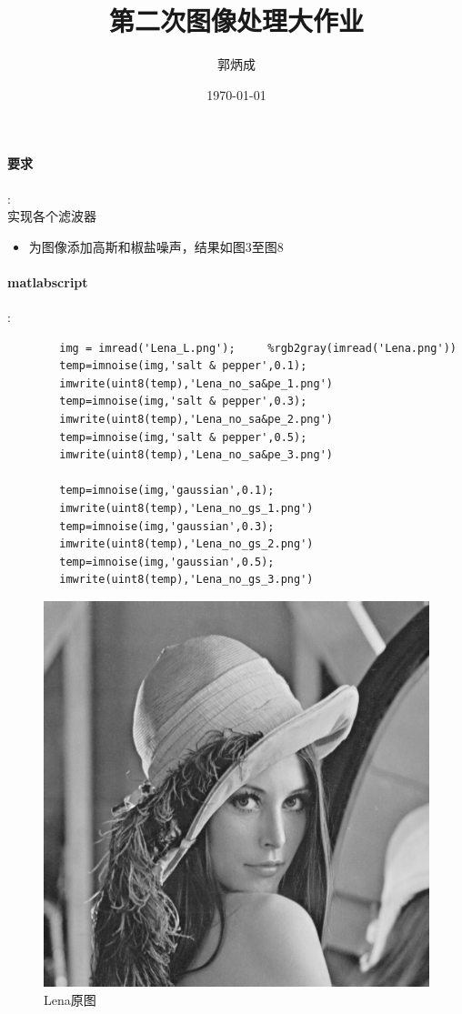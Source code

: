 \documentclass{article}
\begin{document}
    \title{第二次图像处理大作业}
    \date{\today}
    \author{郭炳成}
    \maketitle
    \paragraph{要求}:\\
    实现各个滤波器\par

    \begin{itemize}
        \item 为图像添加高斯和椒盐噪声，结果如图3至图8
    \end{itemize}

    \paragraph{matlabscript}:
    \begin{lstlisting}
        img = imread('Lena_L.png');     %rgb2gray(imread('Lena.png'))
        temp=imnoise(img,'salt & pepper',0.1);
        imwrite(uint8(temp),'Lena_no_sa&pe_1.png')
        temp=imnoise(img,'salt & pepper',0.3);
        imwrite(uint8(temp),'Lena_no_sa&pe_2.png')
        temp=imnoise(img,'salt & pepper',0.5);
        imwrite(uint8(temp),'Lena_no_sa&pe_3.png')
        
        temp=imnoise(img,'gaussian',0.1);
        imwrite(uint8(temp),'Lena_no_gs_1.png')
        temp=imnoise(img,'gaussian',0.3);
        imwrite(uint8(temp),'Lena_no_gs_2.png')
        temp=imnoise(img,'gaussian',0.5);
        imwrite(uint8(temp),'Lena_no_gs_3.png')        
    \end{lstlisting}\par

    
    \begin{figure}
        \center
        \includegraphics[scale=0.5]{img/Lena_L.png}
        \caption{Lena原图}
    \end{figure}
\end{document}
